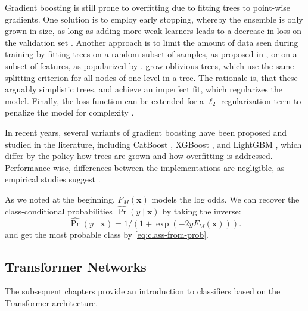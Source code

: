 Gradient boosting is still prone to \gls{overfitting} due to fitting trees to point-wise gradients. One solution is to employ early stopping, whereby the ensemble is only grown in size, as long as adding more weak learners leads to a decrease in loss on the validation set \autocite[][365]{hastietrevorElementsStatisticalLearning2009}. Another approach is to limit the amount of data seen during training by fitting trees on a random subset of samples, as proposed in \textcite[][369]{friedmanStochasticGradientBoosting2002}, or on a subset of features, as popularized by \textcite[][787]{chenXGBoostScalableTree2016}. \textcite[][6644]{prokhorenkovaCatBoostUnbiasedBoosting2018} grow oblivious trees, which use the same splitting criterion for all nodes of one level in a tree. The rationale is, that these arguably simplistic trees, and achieve an imperfect fit, which regularizes the model. Finally, the loss function can be extended for a $\ell_2$ regularization term to penalize the model for complexity \autocite[][786]{chenXGBoostScalableTree2016}.

In recent years, several variants of gradient boosting have been proposed and studied in the literature, including CatBoost \autocite[][6639--6649]{prokhorenkovaCatBoostUnbiasedBoosting2018}, XGBoost \autocite[][785--794]{chenXGBoostScalableTree2016}, and LightGBM \autocite[][785--794]{keLightGBMHighlyEfficient2017}, which differ by the policy how trees are grown and how \gls{overfitting} is addressed. Performance-wise, differences between the implementations are negligible, as empirical studies suggest \autocites[][18946]{gorishniyRevisitingDeepLearning2021}[][7]{somepalliSaintImprovedNeural2021}[][14]{borisovDeepNeuralNetworks2022}.

As we noted at the beginning, $F_M(\mathbf{x})$ models the log odds. We can recover the class-conditional probabilities $\widehat{\operatorname{Pr}}(y \mid \mathbf{x})$ by taking the inverse:
\begin{equation}
    \widehat{\operatorname{Pr}}(y \mid \mathbf{x}) = 1 /\left(1+\exp(-2yF_M(\mathbf{x}))\right).
\end{equation}
and get the most probable class by \cref{eq:class-from-prob}.

\subsection{Transformer Networks}\label{sec:transformer-networks}

The subsequent chapters provide an introduction to classifiers based on the Transformer architecture.


